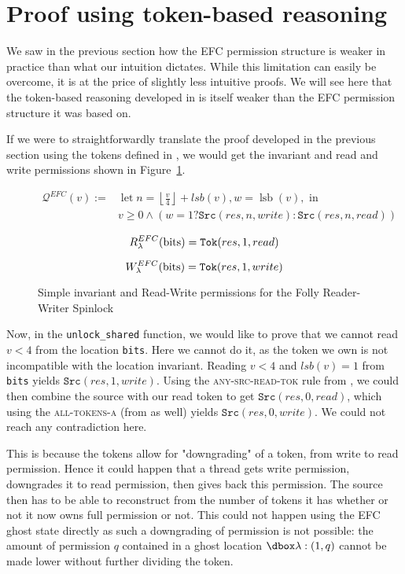 \section{Proof using token-based reasoning}
We saw in the previous section how the EFC permission structure is weaker in practice than what our intuition dictates. While this limitation can easily be overcome, it is at the price of slightly less intuitive proofs. We will see here that the token-based reasoning developed in \cite{pascal} is itself weaker than the EFC permission structure it was based on.

If we were to straightforwardly translate the proof developed in the previous section using the tokens defined in \cite{pascal}, we would get the invariant and read and write permissions shown in Figure~\ref{fig:invToksRWFolly}.

\begin{figure}
$$\begin{aligned} \mathcal{Q}^{EFC}(v) :=& \operatorname{let} n=\left\lfloor\frac{v}{4}\right\rfloor + lsb(v), w=\operatorname{lsb}(v), \text { in } \\ & v \geq 0 \wedge (w = 1 ? \texttt{Src}(res, n, write) : \texttt{Src}(res, n, read))
\end{aligned} $$

$$R_{\lambda}^{EFC}(\text{bits}) = \texttt{Tok}(res, 1, read)$$

$$W_{\lambda}^{EFC}(\text{bits}) = \texttt{Tok}(res, 1, write)$$
		\caption{Simple invariant and Read-Write permissions for the Folly Reader-Writer Spinlock}
		\label{fig:invToksRWFolly}
\end{figure}

Now, in the \texttt{unlock\_shared} function, we would like to prove that we cannot read $v < 4$ from the location \texttt{bits}. Here we cannot do it, as the token we own is not incompatible with the location invariant. Reading $v < 4$ and $lsb(v) = 1$ from \texttt{bits} yields $\texttt{Src}(res, 1, write)$. Using the \textsc{any-src-read-tok} rule from \cite{pascal}, we could then combine the source with our read token to get $\texttt{Src}(res, 0, read)$, which using the \textsc{all-tokens-a} (from \cite{pascal} as well) yields $\texttt{Src}(res, 0, write)$. We could not reach any contradiction here.

This is because the tokens allow for "downgrading" of a token, from write to read permission. Hence it could happen that a thread gets write permission, downgrades it to read permission, then gives back this permission. The source then has to be able to reconstruct from the number of tokens it has whether or not it now owns full permission or not. This could not happen using the EFC ghost state directly as such a downgrading of permission is not possible: the amount of permission $q$ contained in a ghost location $\ghost{\lambda : (1, q)}$ cannot be made lower without further dividing the token.

